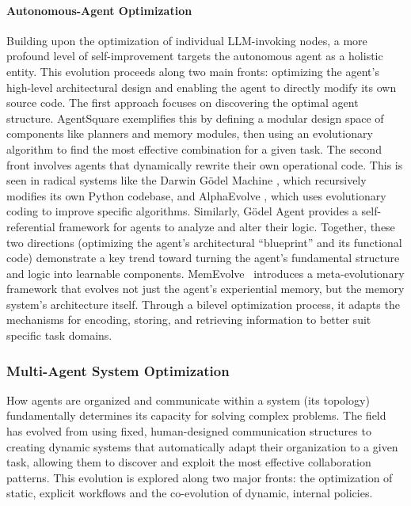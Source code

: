 \documentclass[10pt]{article} %
\begin{document}
\paragraph{Autonomous-Agent Optimization}
Building upon the optimization of individual LLM-invoking nodes, a more profound level of self-improvement targets the autonomous agent as a holistic entity. This evolution proceeds along two main fronts: optimizing the agent's high-level architectural design and enabling the agent to directly modify its own source code. The first approach focuses on discovering the optimal agent structure. AgentSquare \citep{shang2025agentsquare} exemplifies this by defining a modular design space of components like planners and memory modules, then using an evolutionary algorithm to find the most effective combination for a given task. The second front involves agents that dynamically rewrite their own operational code. This is seen in radical systems like the Darwin Gödel Machine \citep{zhang2025darwin}, which recursively modifies its own Python codebase, and AlphaEvolve \citep{novikov2025alphaevolve}, which uses evolutionary coding to improve specific algorithms. Similarly, Gödel Agent \citep{yin2025godelagentselfreferentialagent} provides a self-referential framework for agents to analyze and alter their logic. Together, these two directions (optimizing the agent's architectural “blueprint” and its functional code) demonstrate a key trend toward turning the agent's fundamental structure and logic into learnable components. MemEvolve~\citep{zhang2025memevolve} introduces a meta-evolutionary framework that evolves not just the agent's experiential memory, but the memory system's architecture itself. Through a bilevel optimization process, it adapts the mechanisms for encoding, storing, and retrieving information to better suit specific task domains.

\subsubsection{Multi-Agent System Optimization}

How agents are organized and communicate within a system (its topology) fundamentally determines its capacity for solving complex problems. The field has evolved from using fixed, human-designed communication structures to creating dynamic systems that automatically adapt their organization to a given task, allowing them to discover and exploit the most effective collaboration patterns. This evolution is explored along two major fronts: the optimization of static, explicit workflows and the co-evolution of dynamic, internal policies.
\end{document}
